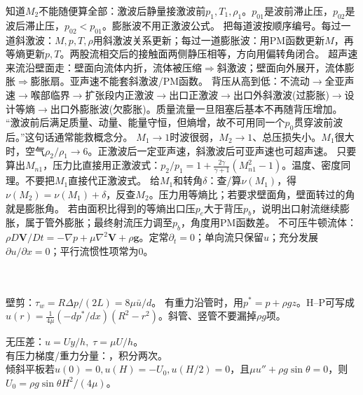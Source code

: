 知道$M_2$不能随便算全部：激波后静量接激波前$p_1,T_1,\rho_1$。$p_{01}$是波前滞止压，$p_{02}$是波后滞止压，$p_{02}<p_{01}$。膨胀波不用正激波公式。
把每道波按顺序编号。每过一道斜激波：$M,p,T,\rho$用斜激波关系更新；每过一道膨胀波：用PM函数更新$M$，再等熵更新$p,T$。两股流相交后的接触面两侧静压相等，方向用偏转角闭合。
超声速来流沿壁面走：壁面向流体内折，流体被压缩$\Rightarrow$斜激波；壁面向外展开，流体膨胀$\Rightarrow$膨胀扇。亚声速不能套斜激波/PM函数。
背压从高到低：不流动$\to$全亚声速$\to$喉部临界$\to$扩张段内正激波$\to$出口正激波$\to$出口外斜激波(过膨胀)$\to$设计等熵$\to$出口外膨胀波(欠膨胀)。质量流量一旦阻塞后基本不再随背压增加。
“激波前后满足质量、动量、能量守恒，但熵增，故不可用同一个$p_0$贯穿波前波后。”这句话通常能救概念分。
$M_1\to1$时波很弱，$M_2\to1$、总压损失小。$M_1$很大时，空气$\rho_2/\rho_1\to6$。正激波后一定亚声速，斜激波后可亚声速也可超声速。
只要算出$M_{n1}$，压力比直接用正激波式：$p_2/p_1=1+\frac{2\gamma}{\gamma+1}(M_{n1}^2-1)$。温度、密度同理。不要把$M_1$直接代正激波式。
给$M_1$和转角$\delta$：查/算$\nu(M_1)$，得$\nu(M_2)=\nu(M_1)+\delta$，反查$M_2$。压力用等熵比；若要求壁面角，壁面转过的角就是膨胀角。
若由面积比得到的等熵出口压$p_e$大于背压$p_b$，说明出口射流继续膨胀，属于管外膨胀；最终射流压力调至$p_b$，角度用PM函数差。
\schemeviscous
{}
不可压牛顿流体：$\rho D\bm V/Dt=-\nabla p+\mu\nabla^2\bm V+\rho\bm g$。定常$\partial_t=0$；单向流只保留$u$；充分发展$\partial u/\partial x=0$；平行流惯性项常为0。\\

\\
\\
壁剪：$\tau_w=R\Delta p/(2L)=8\mu\bar u/d$。
有重力沿管时，用$p^*=p+\rho gz$。H--P可写成$u(r)=\frac{1}{4\mu}(-dp^*/dx)(R^2-r^2)$。斜管、竖管不要漏掉$\rho g$项。

无压差：$u=Uy/h,\;\tau=\mu U/h$。\\
有压力梯度/重力分量：，积分两次。\\
倾斜平板若$u(0)=0,u(H)=-U_0,u(H/2)=0$，且$\mu u''+\rho g\sin\theta=0$，则$U_0=\rho g\sin\theta H^2/(4\mu)$。

